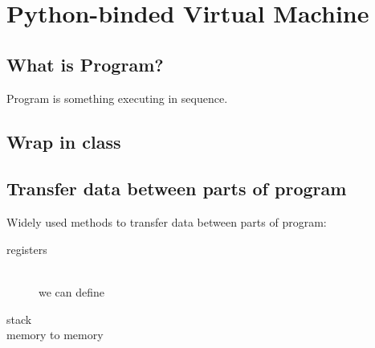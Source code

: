\chapter{Python-binded Virtual Machine}
\clearpage

\section{What is Program?}

Program is something executing in sequence.



\section{Wrap in class}



\section{Transfer data between parts of program}

Widely used methods to transfer data between parts of program:
\begin{description}
\item[registers]\ \\
we can define 
\item[stack]
\item[memory to memory]
\end{description}
